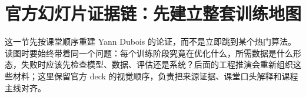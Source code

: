 \section{官方幻灯片证据链：先建立整套训练地图}

这一节先按课堂顺序重建 Yann Dubois 的论证，而不是立即跳到某个热门算法。读图时要始终带着同一个问题：每个训练阶段究竟在优化什么，所需数据是什么形态，失败时应该先检查模型、数据、评估还是系统？后面的工程推演会重新组织这些材料；这里保留官方 deck 的视觉顺序，负责把来源证据、课堂口头解释和课程主线对齐。

